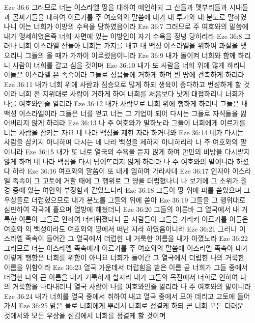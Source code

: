 Eze 36:6  그러므로 너는 이스라엘 땅을 대하여 예언하되 그 산들과 멧부리들과 시내들과 골짜기들을 대하여 이르기를 주 여호와의 말씀에 내가 내 투기와 내 분노로 말하였나니 이는 너희가 이방의 수욕을 당하였음이라
Eze 36:7  그러므로 주 여호와의 말씀에 내가 맹세하였은즉 너희 사면에 있는 이방인이 자기 수욕을 정녕 당하리라
Eze 36:8  그러나 너희 이스라엘 산들아 너희는 가지를 내고 내 백성 이스라엘을 위하여 과실을 맺으리니 그들의 올 때가 가까이 이르렀음이니라
Eze 36:9  내가 돌이켜 너희와 함께 하리니 사람이 너희를 갈고 심을 것이며
Eze 36:10  내가 또 사람을 너희 위에 많게 하리니 이들은 이스라엘 온 족속이라 그들로 성읍들에 거하게 하며 빈 땅에 건축하게 하리라
Eze 36:11  내가 너희 위에 사람과 짐승으로 많게 하되 생육이 중다하고 번성하게 할 것이라 너희 전 지위대로 사람이 거하게 하여 너희를 처음보다 낫게 대접하리니 너희가 나를 여호와인줄 알리라
Eze 36:12  내가 사람으로 너희 위에 행하게 하리니 그들은 내 백성 이스라엘이라 그들은 너를 얻고 너는 그 기업이 되어 다시는 그들로 자식들을 잃어버리지 않게 하리라
Eze 36:13  나 주 여호와가 말하노라 그들이 너희에게 이르기를 너는 사람을 삼키는 자요 네 나라 백성을 제한 자라 하거니와
Eze 36:14  네가 다시는 사람을 삼키지 아니하며 다시는 네 나라 백성을 제하지 아니하리라 나 주 여호와의 말이니라
Eze 36:15  내가 또 너로 열국의 수욕을 듣지 않게 하며 만민의 비방을 다시받지 않게 하며 네 나라 백성을 다시 넘어뜨리지 않게 하리라 나 주 여호와의 말이니라 하셨다 하라
Eze 36:16  여호와의 말씀이 또 내게 임하여 가라사대
Eze 36:17  인자야 이스라엘 족속이 그 고토에 거할 때에 그 행위로 그 땅을 더럽혔나니 나 보기에 그 소위가 월경 중에 있는 여인의 부정함과 같았느니라
Eze 36:18  그들이 땅 위에 피를 쏟았으며 그 우상들로 더럽혔으므로 내가 분노를 그들의 위에 쏟아
Eze 36:19  그들을 그 행위대로 심판하여 각국에 흩으며 열방에 헤쳤더니
Eze 36:20  그들의 이른바 그 열국에서 내 거룩한 이름이 그들로 인하여 더러워졌나니 곧 사람들이 그들을 가리켜 이르기를 이들은 여호와 의 백성이라도 여호와의 땅에서 떠난 자라 하였음이니라
Eze 36:21  그러나 이스라엘 족속이 들어간 그 열국에서 더럽힌 내 거룩한 이름을 내가 아꼈노라
Eze 36:22  그러므로 너는 이스라엘 족속에게 이르기를 주 여호와의 말씀에 이스라엘 족속아 내가 이렇게 행함은 너희를 위함이 아니요 너희가 들어간 그 열국에서 더럽힌 나의 거룩한 이름을 위함이라
Eze 36:23  열국 가운데서 더럽힘을 받은 이름 곧 너희가 그들 중에서 더럽힌 나의 큰 이름을 내가 거룩하게 할지라 내가 그들의 목전에서 너희로 인하여 나의 거룩함을 나타내리니 열국 사람이 나를 여호와인줄 알리라 나 주 여호와의 말이니라
Eze 36:24  내가 너희를 열국 중에서 취하여 내고 열국 중에서 모아 데리고 고토에 들어가서
Eze 36:25  맑은 물로 너희에게 뿌려서 너희로 정결케 하되 곧 너희 모든 더러운 것에서와 모든 우상을 섬김에서 너희를 정결케 할 것이며
